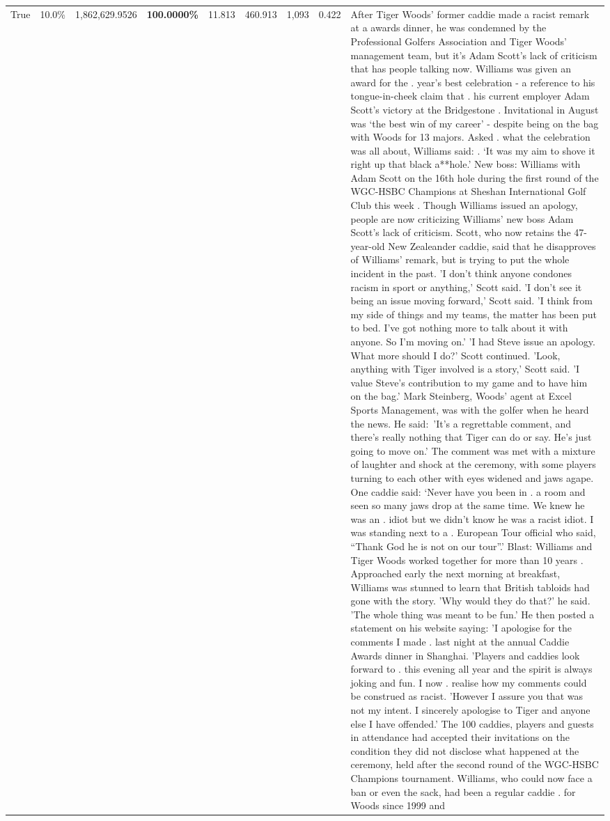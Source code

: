 \begin{table}[H]
\begin{tabular}{lllrlllll}
True & 10.0\% & 1,862,629.9526 & \bfseries \color{red} 100.0000\% & 11.813 & 460.913 & 1,093 & 0.422 & After Tiger Woods' former caddie made a racist remark at a awards dinner, he was condemned by the Professional Golfers Association and Tiger Woods' management team, but it's Adam Scott's lack of criticism that has people talking now. Williams was given an award for the . year’s best celebration - a reference to his tongue-in-cheek claim that . his current employer Adam Scott’s victory at the Bridgestone . Invitational in August was ‘the best win of my career’ - despite being on the bag with Woods for 13 majors. Asked . what the celebration was all about, Williams said: . ‘It was my aim to shove it right up that black a**hole.’ New boss: Williams with Adam Scott  on the 16th hole during the first round of the WGC-HSBC Champions at Sheshan International Golf Club this week . Though Williams issued an apology, people are now criticizing Williams' new boss Adam Scott's lack of criticism. Scott, who now retains the 47-year-old New Zealeander caddie, said that he disapproves of Williams' remark, but is trying to put the whole incident in the past. 'I don't think anyone condones racism in sport or anything,' Scott said. 'I don't see it being an issue moving forward,' Scott said. 'I think from my side of things and my teams, the matter has been put to bed. I've got nothing more to talk about it with anyone. So I'm moving on.' 'I had Steve issue an apology. What more should I do?' Scott continued. 'Look, anything with Tiger involved is a story,' Scott said. 'I value Steve's contribution to my game and to have him on the bag.' Mark Steinberg, Woods' agent at Excel Sports Management, was with the golfer when he heard the news. He said: 'It's a regrettable comment, and there's really nothing that Tiger can do or say. He's just going to move on.' The comment was met with a mixture of laughter and shock at the ceremony, with some players turning to each other with eyes widened and jaws agape. One caddie said: ‘Never have you been in . a room and seen so many jaws drop at the same time. We knew he was an . idiot but we didn’t know he was a racist idiot. I was standing next to a . European Tour official who said, “Thank God he is not on our tour”.’ Blast: Williams and Tiger Woods worked together for more than 10 years . Approached early the next morning at breakfast, Williams was stunned to learn that British tabloids had gone with the story. 'Why would they do that?' he said. 'The whole thing was meant to be fun.' He then posted a statement on his website saying: 'I apologise for the comments I made . last night at the annual Caddie Awards dinner in Shanghai. 'Players and caddies look forward to . this evening all year and the spirit is always joking and fun. I now . realise how my comments could be construed as racist. 'However I assure you that was not my intent. I sincerely apologise to Tiger and anyone else I have offended.' The 100 caddies, players and guests in attendance had accepted their invitations on the condition they did not disclose what happened at the ceremony, held after the second round of the WGC-HSBC Champions tournament. Williams, who could now face a ban or even the sack, had been a regular caddie . for Woods since 1999 and 
\end{tabular}
\end{table}
